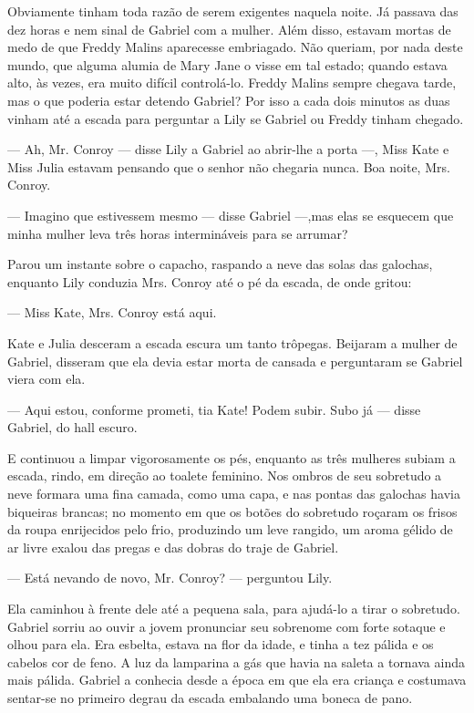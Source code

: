 Obviamente tinham toda razão de serem exigentes naquela noite. Já
passava das dez horas e nem sinal de Gabriel com a mulher. Além disso,
estavam mortas de medo de que Freddy Malins aparecesse embriagado. Não
queriam, por nada deste mundo, que alguma alumia de Mary Jane o visse
em tal estado; quando estava alto, às vezes, era muito difícil
controlá-lo. Freddy Malins sempre chegava tarde, mas o que poderia
estar detendo Gabriel? Por isso a cada dois minutos as duas vinham até
a escada para perguntar a Lily se Gabriel ou Freddy tinham chegado.

--- Ah, Mr. Conroy --- disse Lily a Gabriel ao abrir-lhe a porta ---,
Miss Kate e Miss Julia estavam pensando que o senhor não chegaria
nunca. Boa noite, Mrs. Conroy.

--- Imagino que estivessem mesmo --- disse Gabriel ---,mas elas se
esquecem que minha mulher leva três horas intermináveis para se
arrumar?

Parou um instante sobre o capacho, raspando a neve das solas das
galochas, enquanto Lily conduzia Mrs. Conroy até o pé da escada, de
onde gritou:

--- Miss Kate, Mrs. Conroy está aqui.

Kate e Julia desceram a escada escura um tanto trôpegas. Beijaram a
mulher de Gabriel, disseram que ela devia estar morta de cansada e
perguntaram se Gabriel viera com ela.

--- Aqui estou, conforme prometi, tia Kate! Podem subir. Subo já ---
disse Gabriel, do hall escuro.

E continuou a limpar vigorosamente os pés, enquanto as três mulheres
subiam a escada, rindo, em direção ao toalete feminino. Nos ombros de
seu sobretudo a neve formara uma fina camada, como uma capa, e nas
pontas das galochas havia biqueiras brancas; no momento em que os
botões do sobretudo roçaram os frisos da roupa enrijecidos pelo frio,
produzindo um leve rangido, um aroma gélido de ar livre exalou das
pregas e das dobras do traje de Gabriel.

--- Está nevando de novo, Mr. Conroy? --- perguntou Lily.

Ela caminhou à frente dele até a pequena sala, para ajudá-lo a tirar o
sobretudo. Gabriel sorriu ao ouvir a jovem pronunciar seu sobrenome
com forte sotaque e olhou para ela. Era esbelta, estava na flor da
idade, e tinha a tez pálida e os cabelos cor de feno. A luz da
lamparina a gás que havia na saleta a tornava ainda mais pálida.
Gabriel a conhecia desde a época em que ela era criança e costumava
sentar-se no primeiro degrau da escada embalando uma boneca de pano.

